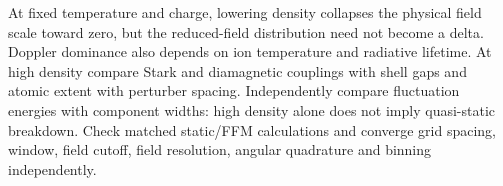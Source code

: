 \documentclass[11pt,a4paper]{article}
\numberwithin{equation}{section}
\begin{document}
At fixed temperature and charge, lowering density collapses the physical field
scale toward zero, but the reduced-field distribution need not become a delta.
Doppler dominance also depends on ion temperature and radiative lifetime.
At high density compare Stark and diamagnetic couplings with shell gaps and
atomic extent with perturber spacing. Independently compare fluctuation energies
with component widths: high density alone does not imply quasi-static breakdown.
Check matched static/FFM calculations and converge grid spacing, window, field
cutoff, field resolution, angular quadrature and binning independently.

\printbibliography
\end{document}
